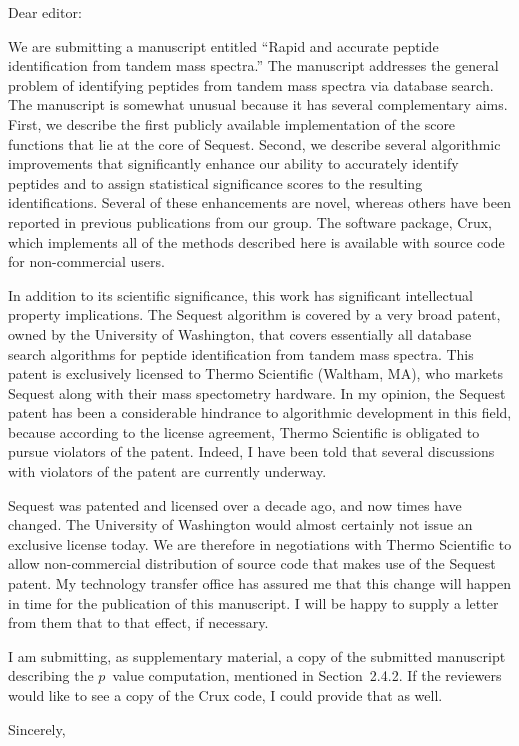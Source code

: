 \documentclass{letter}
\begin{document}
\begin{letter}{}

\opening{Dear editor:}

We are submitting a manuscript entitled ``Rapid and accurate peptide
identification from tandem mass spectra.''  The manuscript addresses
the general problem of identifying peptides from tandem mass spectra
via database search.  The manuscript is somewhat unusual because it
has several complementary aims.  First, we describe the first publicly
available implementation of the score functions that lie at the core
of {\sc Sequest}.  Second, we describe several algorithmic
improvements that significantly enhance our ability to accurately
identify peptides and to assign statistical significance scores to the
resulting identifications.  Several of these enhancements are novel,
whereas others have been reported in previous publications from our
group.  The software package, Crux, which implements all of the
methods described here is available with source code for
non-commercial users.

In addition to its scientific significance, this work has significant
intellectual property implications.  The {\sc Sequest} algorithm is
covered by a very broad patent, owned by the University of Washington,
that covers essentially all database search algorithms for peptide
identification from tandem mass spectra.  This patent is exclusively
licensed to Thermo Scientific (Waltham, MA), who markets {\sc Sequest}
along with their mass spectometry hardware.  In my opinion, the {\sc
Sequest} patent has been a considerable hindrance to algorithmic
development in this field, because according to the license agreement,
Thermo Scientific is obligated to pursue violators of the patent.
Indeed, I have been told that several discussions with violators of
the patent are currently underway.

{\sc Sequest} was patented and licensed over a decade ago, and now
times have changed.  The University of Washington would almost
certainly not issue an exclusive license today.  We are therefore in
negotiations with Thermo Scientific to allow non-commercial
distribution of source code that makes use of the {\sc Sequest}
patent.  My technology transfer office has assured me that this change
will happen in time for the publication of this manuscript.  I will be
happy to supply a letter from them that to that effect, if necessary.


I am submitting, as supplementary material, a copy of the submitted
manuscript describing the $p$~value computation, mentioned in
Section~2.4.2.  If the reviewers would like to see a copy of the Crux
code, I could provide that as well.

\closing{Sincerely,}

\end{letter}
\end{document}
